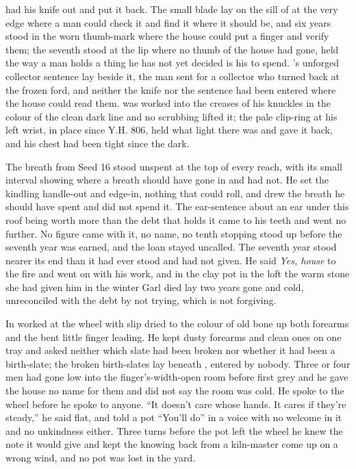  had his knife out and put it back. The small blade lay on the sill of  at the very edge where a man could check it and find it where it should be, and six years stood in the worn thumb-mark where the house could put a finger and verify them; the seventh stood at the lip where no thumb of the house had gone, held the way a man holds a thing he has not yet decided is his to spend. 's unforged collector sentence lay beside it, the man sent for a collector who turned back at the frozen ford, and neither the knife nor the sentence had been entered where the house could read them.  was worked into the creases of his knuckles in the colour of the clean dark line and no scrubbing lifted it; the pale clip-ring at his left wrist, in place since Y.H. 806, held what light there was and gave it back, and his chest had been tight since the dark.

The breath from Seed 16 stood unspent at the top of every reach, with its small interval showing where a breath should have gone in and had not. He set the kindling handle-out and edge-in, nothing that could roll, and drew the breath he should have spent and did not spend it. The ear-sentence about an ear under this roof being worth more than the debt that holds it came to his teeth and went no further. No figure came with it, no name, no tenth stopping stood up before the seventh year was earned, and the loan stayed uncalled. The seventh year stood nearer its end than it had ever stood and had not given. He said \emph{Yes, house} to the fire and went on with his work, and in the clay pot in the loft the warm stone she had given him in the winter Garl died lay two years gone and cold, unreconciled with the debt by not trying, which is not forgiving.

\scenebreak

In   worked at the wheel with slip dried to the colour of old bone up both forearms and the bent little finger leading. He kept dusty forearms and clean ones on one tray and asked neither which slate had been broken nor whether it had been a birth-slate; the broken birth-slates lay beneath , entered by nobody. Three or four men had gone low into the finger's-width-open room before first grey and he gave the house no name for them and did not say the room was cold. He spoke to the wheel before he spoke to anyone. “It doesn't care whose hands. It cares if they're steady,” he said flat, and told a pot “You'll do” in a voice with no welcome in it and no unkindness either. Three turns before the pot left the wheel he knew the note it would give and kept the knowing back from a kiln-master come up on a wrong wind, and no pot was lost in the yard.

